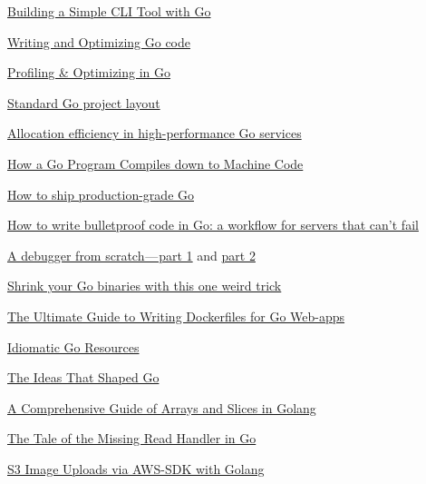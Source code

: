 \documentclass[12pt,notitlepage]{article}
\begin{document}
\href{https://blog.rapid7.com/2016/08/04/build-a-simple-cli-tool-with-golang/}{Building a Simple CLI Tool with Go}

\href{https://github.com/dgryski/go-perfbook/blob/master/performance.md}{\color{red} Writing and Optimizing Go code}

\href{https://github.com/bradfitz/talk-yapc-asia-2015}{Profiling \& Optimizing in Go}

\href{https://github.com/golang-standards/project-layout}{Standard Go project layout}

\href{https://segment.com/blog/allocation-efficiency-in-high-performance-go-services/}%
{Allocation efficiency in high-performance Go services}

\href{https://hackernoon.com/how-a-go-program-compiles-down-to-machine-code-e4532dc8b8ca}%
{How a Go Program Compiles down to Machine Code}

\href{https://www.oreilly.com/ideas/how-to-ship-production-grade-go}{How to ship production-grade Go}

\href{https://medium.freecodecamp.org/how-to-write-bulletproof-code-in-go-a-workflow-for-servers-that-cant-fail-10a14a765f22}%
{How to write bulletproof code in Go: a workflow for servers that can’t fail}

\href{https://medium.com/@lizrice/a-debugger-from-scratch-part-1-7f55417bc85f}{A debugger from scratch --- part 1} 
and \href{https://medium.com/@lizrice/a-debugger-from-scratch-part-2-9954006850bd}{part 2}

\href{https://blog.filippo.io/shrink-your-go-binaries-with-this-one-weird-trick/}%
{Shrink your Go binaries with this one weird trick}

\href{https://blog.hasura.io/the-ultimate-guide-to-writing-dockerfiles-for-go-web-apps-336efad7012c/}%
{The Ultimate Guide to Writing Dockerfiles for Go Web-apps}

\href{https://medium.com/@dgryski/idiomatic-go-resources-966535376dba}{\color{red}Idiomatic Go Resources}

\href{https://medium.com/@dgryski/the-ideas-that-shaped-go-21850a74295f}{The Ideas That Shaped Go}

\href{https://www.sohamkamani.com/blog/golang/arrays-vs-slices/}{A Comprehensive Guide of Arrays and Slices in Golang}

\href{https://zupzup.org/go-missing-read-handler/}{The Tale of the Missing Read Handler in Go}

\href{https://medium.com/@questhenkart/s3-image-uploads-via-aws-sdk-with-golang-63422857c548}{S3 Image Uploads via AWS-SDK with Golang}
\end{document}
